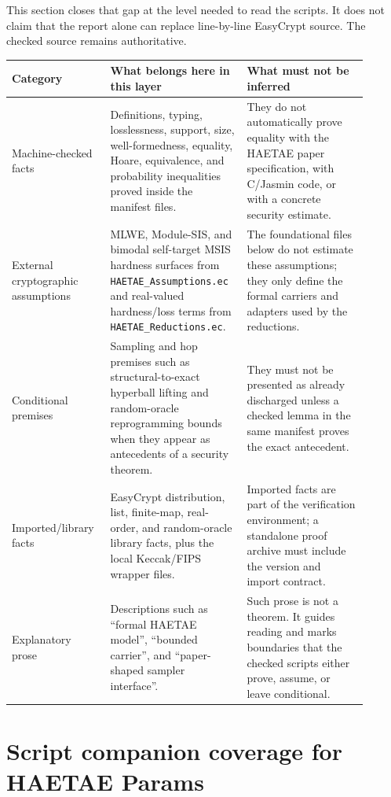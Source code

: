 \documentclass[11pt]{report}
\DeclareRobustCommand{\file}[1]{\ifmmode\text{\nolinkurl{#1}}\else\nolinkurl{#1}\fi}
\theoremstyle{definition}
\theoremstyle{plain}
\begin{document}
This section closes that gap at the level needed to read the scripts.  It does
not claim that the report alone can replace line-by-line EasyCrypt source.
The checked source remains authoritative.

\begin{longtable}{p{0.24\linewidth}p{0.34\linewidth}p{0.32\linewidth}}
\toprule
\textbf{Category} & \textbf{What belongs here in this layer} & \textbf{What must not be inferred} \\
\midrule
Machine-checked facts &
Definitions, typing, losslessness, support, size, well-formedness, equality,
Hoare, equivalence, and probability inequalities proved inside the manifest
files. &
They do not automatically prove equality with the HAETAE paper specification,
with C/Jasmin code, or with a concrete security estimate. \\
\midrule
External cryptographic assumptions &
MLWE, Module-SIS, and bimodal self-target MSIS hardness surfaces from
\file{HAETAE\_Assumptions.ec} and real-valued hardness/loss terms from
\file{HAETAE\_Reductions.ec}. &
The foundational files below do not estimate these assumptions; they only
define the formal carriers and adapters used by the reductions. \\
\midrule
Conditional premises &
Sampling and hop premises such as structural-to-exact hyperball lifting and
random-oracle reprogramming bounds when they appear as antecedents of a
security theorem. &
They must not be presented as already discharged unless a checked lemma in the
same manifest proves the exact antecedent. \\
\midrule
Imported/library facts &
EasyCrypt distribution, list, finite-map, real-order, and random-oracle
library facts, plus the local Keccak/FIPS wrapper files. &
Imported facts are part of the verification environment; a standalone proof
archive must include the version and import contract. \\
\midrule
Explanatory prose &
Descriptions such as ``formal HAETAE model'', ``bounded carrier'', and
``paper-shaped sampler interface''. &
Such prose is not a theorem.  It guides reading and marks boundaries that the
checked scripts either prove, assume, or leave conditional. \\
\bottomrule
\end{longtable}

\section{Script companion coverage for HAETAE Params}
\end{document}
